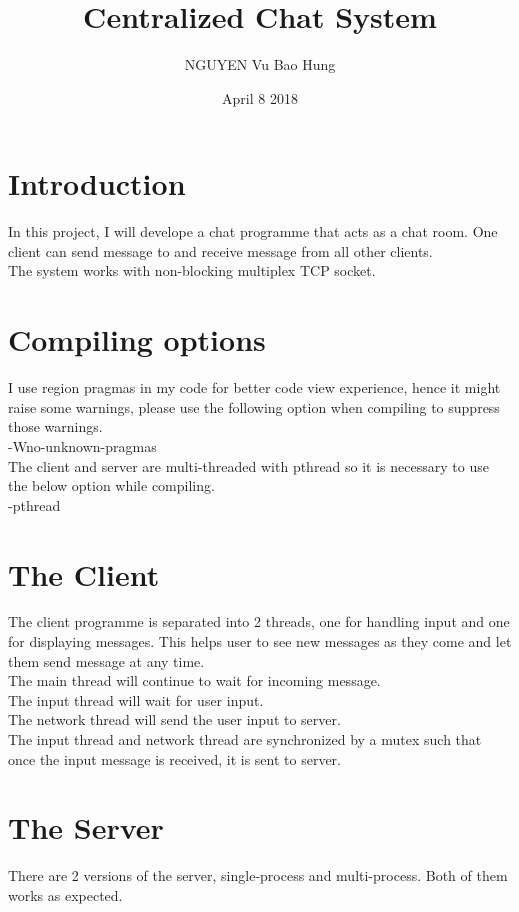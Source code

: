 \documentclass{article}
\title{Centralized Chat System}
\author{NGUYEN Vu Bao Hung}
\date{April 8 2018}
\begin{document}
\maketitle

\section{Introduction}
In this project, I will develope a chat programme that acts as a chat room. One client can send message to and receive message from all other clients.\\
The system works with non-blocking multiplex TCP socket.

\section{Compiling options}
I use region pragmas in my code for better code view experience, hence it might raise some warnings, please use the following option when compiling to suppress those warnings.\\
-Wno-unknown-pragmas\\
The client and server are multi-threaded with pthread so it is necessary to use the below option while compiling.\\
-pthread\\

\section{The Client}
The client programme is separated into 2 threads, one for handling input and one for displaying messages. This helps user to see new messages as they come and let them send message at any time.\\
The main thread will continue to wait for incoming message.\\
The input thread will wait for user input.\\
The network thread will send the user input to server.\\
The input thread and network thread are synchronized by a mutex such that once the input message is received, it is sent to server.

\section{The Server}
There are 2 versions of the server, single-process and multi-process. Both of them works as expected.\\
\end{document}
